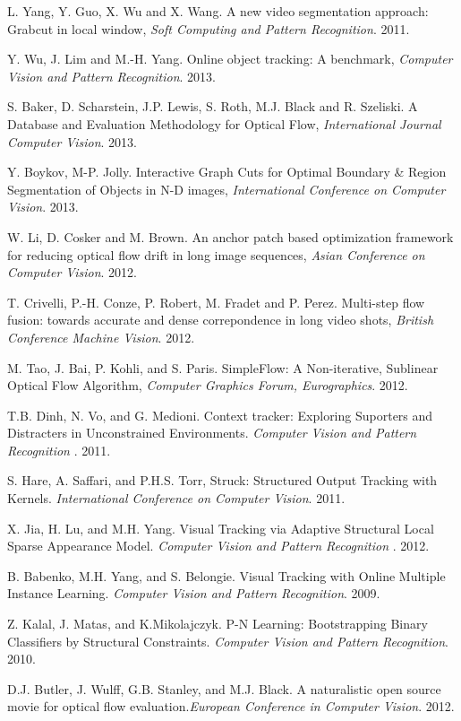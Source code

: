\begin{thebibliography}{99}
L. Yang, Y. Guo, X. Wu and X. Wang. A new video segmentation approach: Grabcut in local window,  {\it Soft Computing and Pattern Recognition}. 2011.

Y. Wu, J. Lim and M.-H. Yang. Online object tracking: A benchmark, {\it Computer Vision and Pattern Recognition}. 2013.

S. Baker, D. Scharstein, J.P. Lewis, S. Roth, M.J. Black and R. Szeliski. A Database and Evaluation Methodology for Optical Flow, {\it International Journal Computer Vision}. 2013.

Y. Boykov, M-P. Jolly. Interactive Graph Cuts for Optimal Boundary \& Region Segmentation of Objects in N-D images, {\it International Conference on Computer Vision}. 2013.

W. Li, D. Cosker and M. Brown. An anchor patch based optimization framework for reducing optical flow drift in long image sequences, {\it Asian Conference on Computer Vision}. 2012.

T. Crivelli, P.-H. Conze, P. Robert, M. Fradet and P. Perez. Multi-step flow fusion: towards accurate and dense correpondence in long video shots, {\it British Conference Machine Vision}. 2012.

M. Tao, J. Bai, P. Kohli, and S. Paris. SimpleFlow: A Non-iterative, Sublinear Optical Flow Algorithm, {\it Computer Graphics Forum, Eurographics}. 2012.

T.B. Dinh, N. Vo, and G. Medioni. Context tracker: Exploring Suporters and Distracters in Unconstrained Environments. {\it Computer Vision and Pattern Recognition }. 2011.

S. Hare, A. Saffari, and P.H.S. Torr, Struck: Structured Output Tracking with Kernels.  {\it International Conference on Computer Vision}. 2011.

X. Jia, H. Lu, and M.H. Yang. Visual Tracking via Adaptive Structural Local Sparse Appearance Model. {\it Computer Vision and Pattern Recognition }. 2012.

B. Babenko, M.H. Yang, and S. Belongie. Visual Tracking with Online Multiple Instance Learning. {\it Computer Vision and Pattern Recognition}. 2009.

Z. Kalal, J. Matas, and K.Mikolajczyk. P-N Learning: Bootstrapping Binary Classiﬁers by Structural Constraints. {\it Computer Vision and Pattern Recognition}. 2010.

D.J. Butler,  J. Wulff,  G.B. Stanley, and M.J. Black. A naturalistic open source movie for optical flow evaluation.{\it European Conference in Computer Vision}. 2012.


\end{thebibliography}
